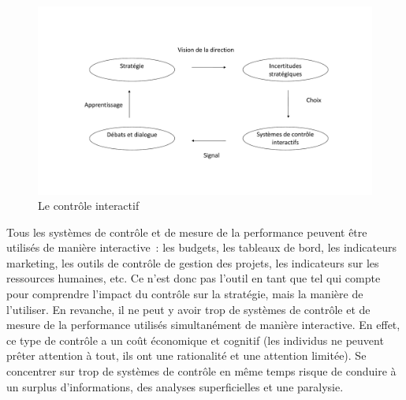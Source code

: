 \documentclass[oneside]{kaobook}
\begin{document}
\begin{figure}[H]

\includegraphics{./img/inter.pdf}
\caption{Le contrôle interactif}
\end{figure}

Tous les systèmes de contrôle et de mesure de la performance peuvent être utilisés de manière interactive : les budgets, les tableaux de bord, les indicateurs marketing, les outils de contrôle de gestion des projets, les indicateurs sur les ressources humaines, etc. Ce n'est donc pas l'outil en tant que tel qui compte pour comprendre l'impact du contrôle sur la stratégie, mais la manière de l'utiliser. En revanche, il ne peut y avoir trop de systèmes de contrôle et de mesure de la performance utilisés simultanément de manière interactive. En effet, ce type de contrôle a un coût économique et cognitif (les individus ne peuvent prêter attention à tout, ils ont une rationalité et une attention limitée). Se concentrer sur trop de systèmes de contrôle en même temps risque de conduire à un surplus d'informations, des analyses superficielles et une paralysie.
\end{document}

